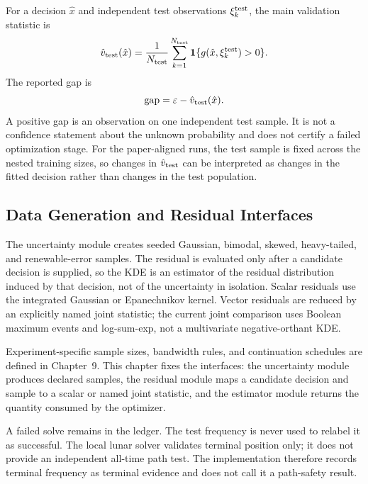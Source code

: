 For a decision $\hat x$ and independent test observations $\xi_k^{\rm test}$, the main validation statistic is
\begin{equation}
  \hat v_{\rm test}(\hat x)=\frac{1}{N_{\mathrm{test}}}\sum_{k=1}^{N_{\mathrm{test}}}
  \mathbf 1\{g(\hat x,\xi_k^{\rm test})>0\}.
  \label{eq:test-violation}
\end{equation}
The reported gap is
\begin{equation}
  \operatorname{gap}=\varepsilon-\hat v_{\rm test}(\hat x).
  \label{eq:gap}
\end{equation}
A positive gap is an observation on one independent test sample. It is not a confidence statement about the unknown probability and does not certify a failed optimization stage. For the paper-aligned runs, the test sample is fixed across the nested training sizes, so changes in $\hat v_{\rm test}$ can be interpreted as changes in the fitted decision rather than changes in the test population.

\subsection{Data Generation and Residual Interfaces}

The uncertainty module creates seeded Gaussian, bimodal, skewed, heavy-tailed, and renewable-error samples. The residual is evaluated only after a candidate decision is supplied, so the KDE is an estimator of the residual distribution induced by that decision, not of the uncertainty in isolation. Scalar residuals use the integrated Gaussian or Epanechnikov kernel. Vector residuals are reduced by an explicitly named joint statistic; the current joint comparison uses Boolean maximum events and log-sum-exp, not a multivariate negative-orthant KDE.

Experiment-specific sample sizes, bandwidth rules, and continuation schedules
are defined in Chapter~9. This chapter fixes the interfaces: the uncertainty
module produces declared samples, the residual module maps a candidate
 decision and sample to a scalar or named joint statistic, and the estimator
module returns the quantity consumed by the optimizer.

A failed solve remains in the ledger. The test frequency is never used to relabel
it as successful. The local lunar solver validates terminal position only; it
does not provide an independent all-time path test. The implementation
therefore records terminal frequency as terminal evidence and does not call it
a path-safety result.

